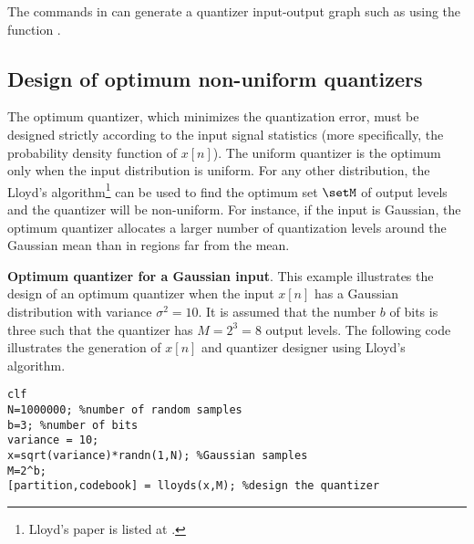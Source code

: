 
The commands in  can generate a quantizer input-output graph such as  using the function .
\eExample


\subsection{Design of optimum non-uniform quantizers}

The optimum quantizer, which minimizes the quantization error, must be designed strictly according to the input signal statistics (more specifically, the probability density function of $x[n]$). The uniform quantizer is the optimum only when the input distribution is uniform. For any other distribution, the Lloyd's algorithm\footnote{Lloyd's paper is listed at .} can be used to find the optimum set $\setM$ of output levels and the quantizer will be non-uniform. For instance, if the input is Gaussian, the optimum quantizer allocates a larger number of quantization levels around the Gaussian mean than in regions far from the mean.

\bExample \textbf{Optimum quantizer for a Gaussian input}.
\label{ex:gaussian_quantization}
This example illustrates the design of an optimum quantizer when the input $x[n]$ has a Gaussian distribution with variance
$\sigma^2=10$. It is assumed that the number $b$ of bits is three such that the quantizer has $M=2^3=8$ output levels.
The following code illustrates the generation of $x[n]$ and quantizer designer using Lloyd's algorithm.
\begin{lstlisting}
clf
N=1000000; %number of random samples
b=3; %number of bits
variance = 10;
x=sqrt(variance)*randn(1,N); %Gaussian samples
M=2^b;
[partition,codebook] = lloyds(x,M); %design the quantizer
\end{lstlisting}

